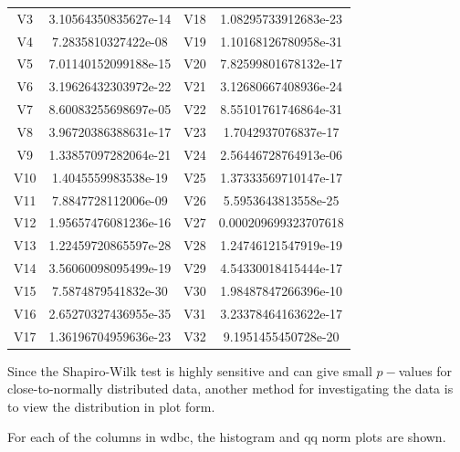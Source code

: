 \documentclass[11pt]{article}
\begin{document}
\begin{enumerate}
\begin{center}
\begin{tabular}{|cc | cc|}
\hline
V3  &  3.10564350835627e-14 &  V18 &  1.08295733912683e-23 \\ 
V4  &  7.2835810327422e-08  &  V19 &  1.10168126780958e-31 \\
V5  &  7.01140152099188e-15 &  V20 &  7.82599801678132e-17 \\
V6  &  3.19626432303972e-22 &  V21 &  3.12680667408936e-24 \\
V7  &  8.60083255698697e-05 &  V22 &  8.55101761746864e-31 \\
V8  &  3.96720386388631e-17 &  V23 &  1.7042937076837e-17 \\
V9  &  1.33857097282064e-21 &  V24 &  2.56446728764913e-06 \\
V10 &  1.4045559983538e-19  &  V25 &  1.37333569710147e-17 \\
V11 &  7.8847728112006e-09  &  V26 &  5.5953643813558e-25 \\
V12 &  1.95657476081236e-16 &  V27 &  0.000209699323707618 \\
V13 &  1.22459720865597e-28 &  V28 &  1.24746121547919e-19 \\
V14 &  3.56060098095499e-19 &  V29 &  4.54330018415444e-17 \\
V15 &  7.5874879541832e-30  &  V30 &  1.98487847266396e-10 \\
V16 &  2.65270327436955e-35 &  V31 &  3.23378464163622e-17 \\
V17 &  1.36196704959636e-23 &  V32 &  9.1951455450728e-20 
\tabularnewline
\hline
\end{tabular}
\end{center}

Since the Shapiro-Wilk test is highly sensitive and can give small $p-$values for close-to-normally 
distributed data, another method for investigating the data is to view the distribution in plot form.  

For each of the columns in wdbc, the histogram and qq norm plots are shown. 


\end{enumerate}
\end{document}
